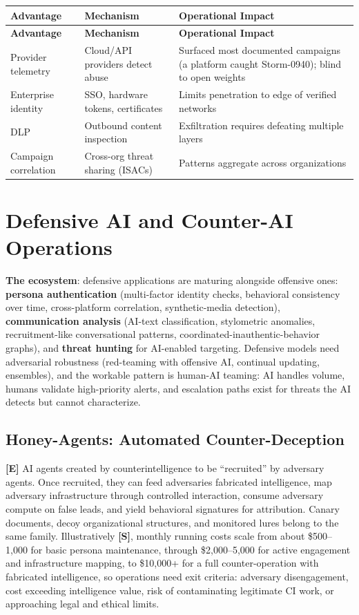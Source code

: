 \documentclass[11pt,letterpaper]{article}
\begin{document}
{\small
\begin{longtable}{L{3cm}L{4cm}L{5.5cm}}
\toprule
\textbf{Advantage} & \textbf{Mechanism} & \textbf{Operational Impact} \\
\midrule
\endfirsthead
\toprule
\textbf{Advantage} & \textbf{Mechanism} & \textbf{Operational Impact} \\
\midrule
\endhead
Provider telemetry & Cloud/API providers detect abuse & Surfaced most documented campaigns (a platform caught Storm-0940); blind to open weights \\*
Enterprise identity & SSO, hardware tokens, certificates & Limits penetration to edge of verified networks \\
DLP & Outbound content inspection & Exfiltration requires defeating multiple layers \\*
Campaign correlation & Cross-org threat sharing (ISACs) & Patterns aggregate across organizations \\
\bottomrule
\end{longtable}}

\section{Defensive AI and Counter-AI Operations}\label{sec:defai}

\textbf{The ecosystem}: defensive applications are maturing alongside offensive ones: \textbf{persona authentication} (multi-factor identity checks, behavioral consistency over time, cross-platform correlation, synthetic-media detection), \textbf{communication analysis} (AI-text classification, stylometric anomalies, recruitment-like conversational patterns, coordinated-inauthentic-behavior graphs), and \textbf{threat hunting} for AI-enabled targeting. Defensive models need adversarial robustness (red-teaming with offensive AI, continual updating, ensembles), and the workable pattern is human-AI teaming: AI handles volume, humans validate high-priority alerts, and escalation paths exist for threats the AI detects but cannot characterize.

\subsection{Honey-Agents: Automated Counter-Deception}

\textbf{[E]} AI agents created by counterintelligence to be ``recruited'' by adversary agents. Once recruited, they can feed adversaries fabricated intelligence, map adversary infrastructure through controlled interaction, consume adversary compute on false leads, and yield behavioral signatures for attribution. Canary documents, decoy organizational structures, and monitored lures belong to the same family. Illustratively \textbf{[S]}, monthly running costs scale from about \$500--1,000 for basic persona maintenance, through \$2,000--5,000 for active engagement and infrastructure mapping, to \$10,000+ for a full counter-operation with fabricated intelligence, so operations need exit criteria: adversary disengagement, cost exceeding intelligence value, risk of contaminating legitimate CI work, or approaching legal and ethical limits.
\end{document}
